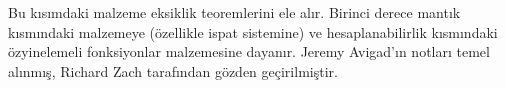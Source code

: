 


\begin{editorial}
 Bu kısımdaki malzeme eksiklik teoremlerini ele alır. Birinci derece
 mantık kısmındaki malzemeye (özellikle ispat sistemine) ve hesaplanabilirlik
 kısmındaki özyinelemeli fonksiyonlar malzemesine dayanır. Jeremy Avigad'ın
 notları temel alınmış, Richard Zach tarafından gözden geçirilmiştir.
\end{editorial}






\OLEndPartHook

